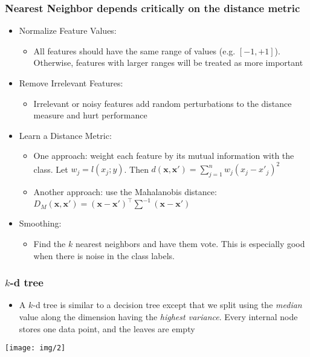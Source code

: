 \documentclass{beamer}
\newcommand*{\utb}{\item[{\texttt{[image: img/UTSymbols-Bullet.png]}}]}
\begin{document}
\begin{frame}
    \frametitle{Nearest Neighbor depends critically on the distance metric}
    \begin{itemize}
        \utb Normalize Feature Values:
        \begin{itemize}
            \utb All features should have the same range of values (e.g. $[-1, +1]$). Otherwise, features with larger ranges will be treated as more important
        \end{itemize}
        \utb Remove Irrelevant Features:
        \begin{itemize}
            \utb Irrelevant or noisy features add random perturbations to the distance measure and hurt performance
        \end{itemize}
        \utb Learn a Distance Metric:
        \begin{itemize}
            \utb One approach: weight each feature by its mutual information with the class. Let $w_j = l(x_j;y)$. Then $d(\mathbf{x},\mathbf{x'}) = \sum_{j=1}^n w_j(x_j - x'_j)^2$
            \utb Another approach: use the Mahalanobis distance: $D_M(\mathbf{x},\mathbf{x'}) = (\mathbf{x} - \mathbf{x'})^\top \sum^{-1} (\mathbf{x} - \mathbf{x'})$
        \end{itemize}
        \utb Smoothing:
        \begin{itemize}
            \utb Find the $k$ nearest neighbors and have them vote. This is especially good when there is noise in the class labels.
        \end{itemize}
    \end{itemize}
\end{frame}

\begin{frame}
    \frametitle{$k$-d tree}
    \begin{itemize}
        \utb A $k$-d tree is similar to a decision tree except that we split using the \textit{median} value along the dimension having the \textit{highest variance}. Every internal node stores one data point, and the leaves are empty
    \end{itemize}
    \begin{center}
        \texttt{[image: img/2]}
    \end{center}
\end{frame}
\end{document}
